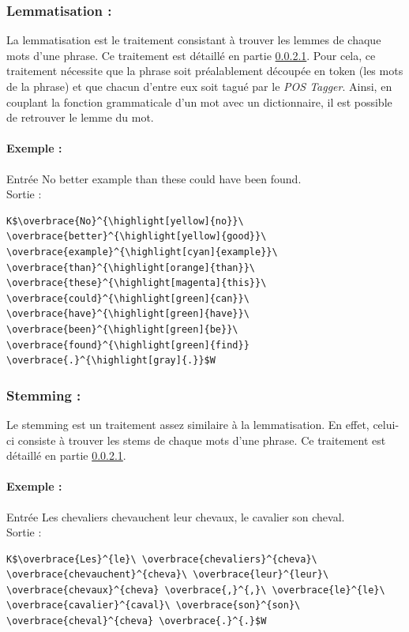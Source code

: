             \subsubsection{Lemmatisation :}
                La lemmatisation est le traitement consistant à trouver les lemmes de chaque mots d'une phrase. Ce traitement est détaillé en partie \ref{}. Pour cela, ce traitement nécessite que la phrase soit préalablement découpée en token (les mots de la phrase) et que chacun d'entre eux soit tagué par le \textit{POS Tagger}. Ainsi, en couplant la fonction grammaticale d'un mot avec un dictionnaire, il est possible de retrouver le lemme du mot.

                \paragraph{Exemple :}
                Entrée \og No better example than these could have been found.\fg\\
                Sortie :
\begin{lstlisting}
K$\overbrace{No}^{\highlight[yellow]{no}}\ \overbrace{better}^{\highlight[yellow]{good}}\ \overbrace{example}^{\highlight[cyan]{example}}\ \overbrace{than}^{\highlight[orange]{than}}\ \overbrace{these}^{\highlight[magenta]{this}}\ \overbrace{could}^{\highlight[green]{can}}\ \overbrace{have}^{\highlight[green]{have}}\ \overbrace{been}^{\highlight[green]{be}}\ \overbrace{found}^{\highlight[green]{find}} \overbrace{.}^{\highlight[gray]{.}}$W
\end{lstlisting}

            \subsubsection{Stemming :}
                Le stemming est un traitement assez similaire à la lemmatisation. En effet, celui-ci consiste à trouver les stems de chaque mots d'une phrase. Ce traitement est détaillé en partie \ref{}.

                \paragraph{Exemple :}
                Entrée \og Les chevaliers chevauchent leur chevaux, le cavalier son cheval.\fg\\
                Sortie :
\begin{lstlisting}
K$\overbrace{Les}^{le}\ \overbrace{chevaliers}^{cheva}\ \overbrace{chevauchent}^{cheva}\ \overbrace{leur}^{leur}\ \overbrace{chevaux}^{cheva} \overbrace{,}^{,}\ \overbrace{le}^{le}\ \overbrace{cavalier}^{caval}\ \overbrace{son}^{son}\ \overbrace{cheval}^{cheva} \overbrace{.}^{.}$W
\end{lstlisting}


